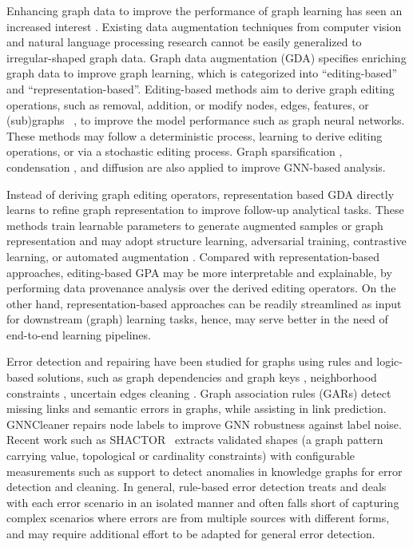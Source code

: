 \documentclass{sig-alternate-10pt}
\begin{document}
\medskip
\medskip

Enhancing graph data to improve
the performance of graph learning has seen an increased interest \cite{abs-2309-10979}.
Existing data augmentation techniques from computer vision and natural language processing research cannot be easily generalized to irregular-shaped graph data.
Graph data augmentation (GDA) \cite{abs-2202-08871} specifies enriching graph data to improve graph learning, which is categorized into
``editing-based'' and ``representation-based''.
Editing-based methods aim to
derive graph editing operations,
such as removal, addition, or modify
nodes, edges, features, or (sub)graphs
~\cite{0003LNW0S21,ZhaoZW21,ZhangZSKK22,HanJLH22,gdet}, to improve the model performance
such as graph neural networks.
These methods may follow a deterministic
process, learning to derive editing operations, or
via a stochastic editing process.
Graph sparsification \cite{ZhengZCSNYC020}, condensation \cite{JinZZLTS22}, and diffusion \cite{ZhaoDDKT21} are also
applied to improve GNN-based analysis.

Instead of deriving graph
editing operators, representation based GDA
directly learns to refine graph representation
to improve follow-up analytical tasks.
These methods train learnable parameters to generate augmented samples or graph representation
and may adopt
structure learning, adversarial training, contrastive learning, or automated augmentation \cite{0001XYLWW21,ZhaoTZJ0SASYJ22,SureshLHN21}.
Compared with representation-based approaches, editing-based
GPA may be more
interpretable and explainable, by performing data provenance
analysis over the derived editing operators.
On the other hand,
representation-based approaches
can be readily streamlined
as input for downstream
(graph) learning tasks,
hence, may serve better
in the need of
end-to-end learning pipelines.


Error detection and repairing
have been studied for graphs using rules and logic-based
solutions, such as graph dependencies \cite{FanL19} and graph keys \cite{FanFTD15}, neighborhood constraints \cite{JBM24,linrepairing},
uncertain edges cleaning \cite{LinPCX17}.
Graph association rules (GARs) \cite{FanJLLTZ20}
detect missing links and semantic errors in graphs, while assisting in link prediction.
GNNCleaner \cite{XLXTWLL23} repairs node labels to improve GNN robustness against label noise.
Recent work such as SHACTOR~\cite{rabbani2023shactor}
extracts validated shapes (a graph pattern carrying
value, topological or cardinality constraints) with configurable
measurements such as support to
detect anomalies in knowledge graphs for
error detection and cleaning.
In general,
rule-based error detection treats and
deals with each error scenario
in an isolated manner and
often falls short of capturing
complex scenarios
where errors are from multiple
sources with different forms,
and may require additional effort to
be adapted for general error detection.
\end{document}
